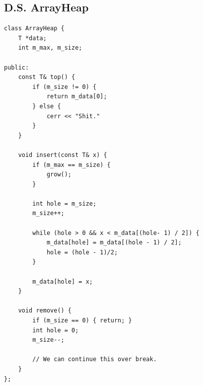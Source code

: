\documentclass{article}
\begin{document}
\subsection*{D.S. ArrayHeap}
\begin{verbatim}
class ArrayHeap {
    T *data;
    int m_max, m_size;

public:
    const T& top() {
        if (m_size != 0) {
            return m_data[0];
        } else {
            cerr << "Shit."
        }
    }

    void insert(const T& x) {
        if (m_max == m_size) {
            grow();
        }

        int hole = m_size;
        m_size++;

        while (hole > 0 && x < m_data[(hole- 1) / 2]) {
            m_data[hole] = m_data[(hole - 1) / 2];
            hole = (hole - 1)/2;
        }

        m_data[hole] = x;
    }

    void remove() {
        if (m_size == 0) { return; }
        int hole = 0;
        m_size--;

        // We can continue this over break.
    }
};
\end{verbatim}
\end{document}
